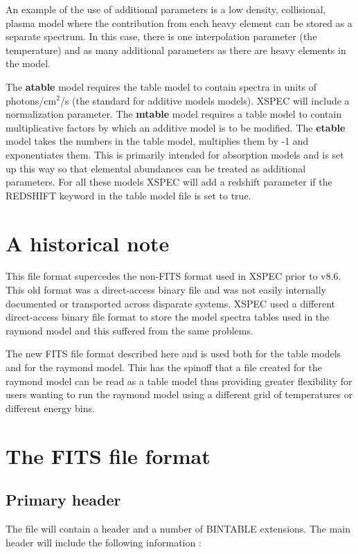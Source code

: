 \documentclass[11pt]{article}
\begin{document}
An example of the use of additional parameters is a low density,
collisional, plasma model where the contribution from each heavy
element can be stored as a separate spectrum. In this case, there
is one interpolation parameter (the temperature) and as many
additional parameters as there are heavy elements in the model.

The {\bf atable} model requires the table model to contain spectra
in units of photons/cm$^2$/s (the standard for additive models
models). XSPEC will include a normalization parameter. The
{\bf mtable} model requires a table model to contain multiplicative
factors by which an additive model is to be modified.
The {\bf etable} model takes the numbers in the table model,
multiplies them by -1 and exponentiates them. This is primarily
intended for absorption models and is set up this way so that
elemental abundances can be treated as additional parameters.
For all these models XSPEC will add a redshift parameter if the
REDSHIFT keyword in the table model file is set to true.


\section{A historical note}

This file format supercedes the non-FITS format used in XSPEC
prior to v8.6. This old format was a direct-access binary file
and was not easily internally documented or transported across
disparate systems. XSPEC used a different direct-access binary 
file format to store the model spectra tables used in the raymond
model and this suffered from the same problems.

The new FITS file format described here and is used both for
the table models and for the raymond model. This has the spinoff
that a file created for the raymond model can be read as a
table model thus providing greater flexibility for users wanting
to run the raymond model using a different grid of temperatures
or different energy bins.

\section{The FITS file format}

\subsection{Primary header}

The file will contain a header and a number of BINTABLE extensions.
The main header will include the following information :
\end{document}
